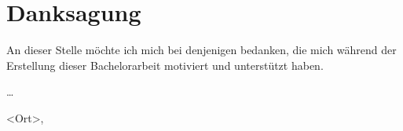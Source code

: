 \chapter*{Danksagung}

An dieser Stelle möchte ich mich bei denjenigen bedanken, die mich während der Erstellung dieser Bachelorarbeit motiviert und unterstützt haben.

\bigskip

\dots

\bigskip

\authorofwork \hfill <Ort>, \dateofsubmission